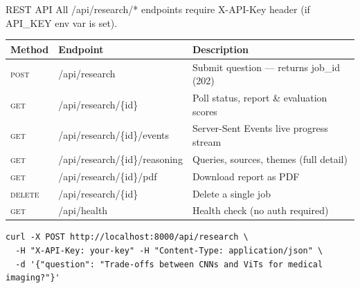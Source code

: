 \documentclass[aspectratio=169, 10pt]{beamer}
\newcommand{\code}[1]{{\ttfamily\small\color{code-red}#1}}
\begin{document}
\begin{frame}[fragile]{REST API}
  {\small All \code{/api/research/*} endpoints require \code{X-API-Key} header
  (if \code{API\_KEY} env var is set).}
  \vspace{0.4em}
  \begin{center}
  \small
  \begin{tabular}{lll}
    \toprule
    \textbf{Method} & \textbf{Endpoint} & \textbf{Description} \\
    \midrule
    \textsc{post}   & \code{/api/research}                   & Submit question --- returns \code{job\_id} (202) \\
    \textsc{get}    & \code{/api/research/\{id\}}            & Poll status, report \& evaluation scores \\
    \textsc{get}    & \code{/api/research/\{id\}/events}     & Server-Sent Events live progress stream \\
    \textsc{get}    & \code{/api/research/\{id\}/reasoning}  & Queries, sources, themes (full detail) \\
    \textsc{get}    & \code{/api/research/\{id\}/pdf}        & Download report as PDF \\
    \textsc{delete} & \code{/api/research/\{id\}}            & Delete a single job \\
    \textsc{get}    & \code{/api/health}                     & Health check (no auth required) \\
    \bottomrule
  \end{tabular}
  \end{center}
  \vspace{0.3em}
\begin{lstlisting}[style=shcode]
curl -X POST http://localhost:8000/api/research \
  -H "X-API-Key: your-key" -H "Content-Type: application/json" \
  -d '{"question": "Trade-offs between CNNs and ViTs for medical imaging?"}'
\end{lstlisting}
\end{frame}
\end{document}
